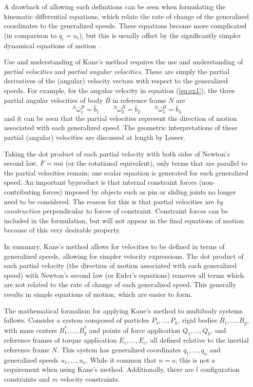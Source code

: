 \documentclass[smallcondensed,final]{svjour3}                     %
\begin{document}
A drawback of allowing such definitions can be seen when formulating the
kinematic differential equations, which relate the rate of change of the
generalized coordinates to the generalized speeds. These equations become more
complicated (in comparison to $\dot{q}_i = u_i$), but this is usually offset by
the significantly simpler dynamical equations of motion~\cite{Mitiguy1996}.

Use and understanding of Kane's method requires the use and understanding of
\textit{partial velocities} and \textit{partial angular velocities}. These are
simply the partial derivatives of the (angular) velocity vectors with respect
to the generalized speeds. For example, for the angular velocity in equation
(\ref{eq:ex1}), the three partial angular velocities of body $B$ in reference
frame $N$ are
\[
{^N}\bar{\omega}^B_{1} = \hat{b}_1 \quad \quad
{^N}\bar{\omega}^B_{2} = \hat{b}_2 \quad \quad
{^N}\bar{\omega}^B_{3} = \hat{b}_3
\]
and it can be seen that the partial velocities represent the direction of
motion associated with each generalized speed. The geometric interpretations of
these partial (angular) velocities are discussed at length by
Lesser\cite{Lesser1992}.

Taking the dot product of each partial velocity with both sides of Newton's
second law, $\bar{F}=m\bar{a}$ (or the rotational equivalent), only terms that
are parallel to the partial velocities remain; one scalar equation is generated
for each generalized speed. An important byproduct is that internal constraint forces
(non-contributing forces) imposed by objects such as pin or sliding joints no
longer need to be considered. The reason for this is that partial velocities
are \textit{by construction} perpendicular to forces of constraint. Constraint
forces can be included in the formulation, but will not appear in the final
equations of motion because of this very desirable property.

In summary, Kane's method allows for velocities to be defined in terms of
generalized speeds, allowing for simpler velocity expressions.  The dot product
of each partial velocity (the direction of motion associated with each
generalized speed) with Newton's second law (or Euler's equations) removes all
terms which are not related to the rate of change of each generalized speed.
This generally results in simple equations of motion, which are easier to form.

The mathematical formalism for applying Kane's method to multibody systems
follows. Consider a system composed of particles $P_1,...,P_h$, rigid bodies
$B_1,...,B_g$, with mass centers $B_1^*,...,B_g^*$ and points of force
application $Q_1,...,Q_k$, and reference frames of torque application
$E_1,...,E_c$, all defined relative to the inertial reference frame $N$. This
system has generalized coordinates $q_1,...,q_n$ and generalized speeds
$u_1,...,u_o$.  While it common that $n = o$, this is not a requirement when
using Kane's method. Additionally, there are $l$ configuration constraints and
$m$ velocity constraints.
\end{document}
